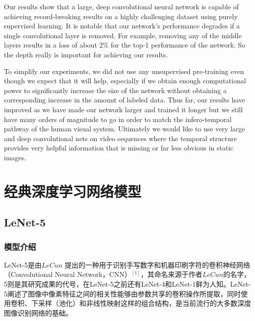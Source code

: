 \documentclass[12pt,a4paper,UTF8,twoside]{book}
\begin{document}
Our results show that a large, deep convolutional neural network is capable of achieving record-breaking results on a highly challenging dataset using purely supervised learning. It is notable that our network's performance degrades if a single convolutional layer is removed. For example, removing any of the middle layers results in a loss of about 2\% for the top-1 performance of the network. So the depth really is important for achieving our results.

To simplify our experiments, we did not use any unsupervised pre-training even though we expect that it will help, especially if we obtain enough computational power to significantly increase the size of the network without obtaining a corresponding increase in the amount of labeled data. Thus far, our results have improved as we have made our network larger and trained it longer but we still have many orders of magnitude to go in order to match the infero-temporal pathway of the human visual system. Ultimately we would like to use very large and deep convolutional nets on video sequences where the temporal structure provides very helpful information that is missing or far less obvious in static images.

\hypertarget{ux7ecfux5178ux6df1ux5ea6ux5b66ux4e60ux7f51ux7edcux6a21ux578b}{%
\chapter{经典深度学习网络模型}\label{ux7ecfux5178ux6df1ux5ea6ux5b66ux4e60ux7f51ux7edcux6a21ux578b}}

\hypertarget{lenet-5}{%
\section{LeNet-5}\label{lenet-5}}

\hypertarget{ux6a21ux578bux4ecbux7ecd}{%
\subsection{模型介绍}\label{ux6a21ux578bux4ecbux7ecd}}

LeNet-5是由\(LeCun\) 提出的一种用于识别手写数字和机器印刷字符的卷积神经网络（Convolutional Neural Network，CNN）\(^{[1]}\)，其命名来源于作者\(LeCun\)的名字，5则是其研究成果的代号，在LeNet-5之前还有LeNet-4和LeNet-1鲜为人知。LeNet-5阐述了图像中像素特征之间的相关性能够由参数共享的卷积操作所提取，同时使用卷积、下采样（池化）和非线性映射这样的组合结构，是当前流行的大多数深度图像识别网络的基础。
\end{document}
